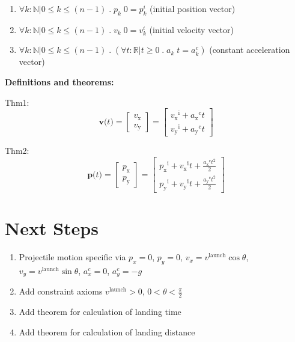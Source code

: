 \documentclass{article}
\begin{document}
\begin{enumerate}
    \item $\forall k: \mathbb{N} | 0 \leq k \leq (n-1) \; . \; p_k \; 0 = p_k^i$ (initial position vector)
    \item $\forall k: \mathbb{N} | 0 \leq k \leq (n-1) \; . \; v_k \; 0 = v_k^i$ (initial velocity vector)
    \item $\forall k: \mathbb{N} | 0 \leq k \leq (n-1) \; . \; (\forall t:
    \mathbb{R} | t \geq 0 \; . \; a_k \; t = a_k^c)$ (constant acceleration vector)
\end{enumerate}

\noindent \textbf{Definitions and theorems:}

Thm1: \begin{displaymath}
    \mathbf{v}\text{(}t\text{)}=\begin{bmatrix}
        v_\text{x}\\
        v_\text{y}
        \end{bmatrix} =\begin{bmatrix}
                               {{v_{\text{x}}}^{\text{i}}}+{{a_{\text{x}}}^{\text{c}}} t\\
                               {{v_{\text{y}}}^{\text{i}}}+{{a_{\text{y}}}^{\text{c}}} t
                               \end{bmatrix}
    \end{displaymath}

Thm2: \begin{displaymath}
    \mathbf{p}\text{(}t\text{)}=\begin{bmatrix}
        p_\text{x}\\
        p_\text{y}
        \end{bmatrix} = \begin{bmatrix}
                               {{p_{\text{x}}}^{\text{i}}}+{{v_{\text{x}}}^{\text{i}}} t+\frac{{{a_{\text{x}}}^{\text{c}}} t^{2}}{2}\\
                               {{p_{\text{y}}}^{\text{i}}}+{{v_{\text{y}}}^{\text{i}}} t+\frac{{{a_{\text{y}}}^{\text{c}}} t^{2}}{2}
                               \end{bmatrix}
    \end{displaymath}

\section{Next Steps}

\begin{enumerate}
    \item Projectile motion specific via $p_x = 0$, $p_y = 0$, $v_x = v^{\text{launch}} \cos \theta$, $v_y = v^{\text{launch}} \sin \theta$, $a_x^c = 0$, $a_y^c = -g$
    \item Add constraint axioms $v^{\text{launch}} > 0$, $0 < \theta < \frac{\pi} {2}$
    \item Add theorem for calculation of landing time
    \item Add theorem for calculation of landing distance
\end{enumerate}
\end{document}
